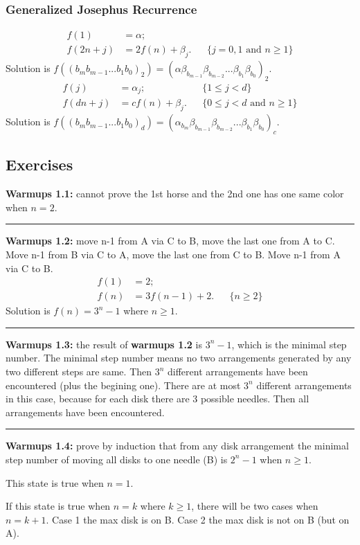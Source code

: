 \documentclass{article}
\begin{document}
\subsubsection{Generalized Josephus Recurrence}
\begin{align}
f(1) & = \alpha;\\
f(2n+j) & = 2f(n)+\beta_j. && \{j=0,1 \text{ and } n\ge 1\}
\end{align}
Solution is $f((b_m b_{m-1} ...b_1 b_0)_2) = (\alpha \beta_{b_{m-1}} \beta_{b_{m-2}} ...\beta_{b_1} \beta_{b_0})_2$.
\begin{align}
f(j) & = \alpha_j; &&\{1\le j<d\}\\
f(dn+j) & = cf(n)+\beta_j. && \{0\le j<d \text{ and } n\ge 1\}
\end{align}
Solution is $f((b_m b_{m-1} ...b_1 b_0)_d) = (\alpha_{b_m} \beta_{b_{m-1}} \beta_{b_{m-2}} ...\beta_{b_1} \beta_{b_0})_c$.

\subsection{Exercises}
\textbf{Warmups 1.1:} cannot prove the 1st horse and the 2nd one has one same color when $n=2$.

\noindent\rule{\textwidth}{0.4pt}
\textbf{Warmups 1.2:} move n-1 from A via C to B, move the last one from A to C.
Move n-1 from B via C to A, move the last one from C to B.
Move n-1 from A via C to B.
\begin{align}
f(1) & = 2;\\
f(n) & = 3f(n-1)+2. && \{n\ge2\}
\end{align}
Solution is $f(n) = 3^n-1$ where $n \ge 1$.

\noindent\rule{\textwidth}{0.4pt}
\textbf{Warmups 1.3:} the result of \textbf{warmups 1.2} is $3^n-1$, which is the minimal step number.
The minimal step number means no two arrangements generated by any two different steps are same.
Then $3^n$ different arrangements have been encountered (plus the begining one).
There are at most $3^n$ different arrangements in this case, because for each disk there are 3 possible needles. 
Then all arrangements have been encountered.

\noindent\rule{\textwidth}{0.4pt}
\textbf{Warmups 1.4:} prove by induction that from any disk arrangement the minimal step number of moving all disks to one needle (B) is $2^n-1$ when $n\ge 1$.


This state is true when $n = 1$.


If this state is true when $n = k$ where $k\ge1$, there will be two cases when $n = k+1$.
Case 1 the max disk is on B.
Case 2 the max disk is not on B (but on A).
\end{document}
